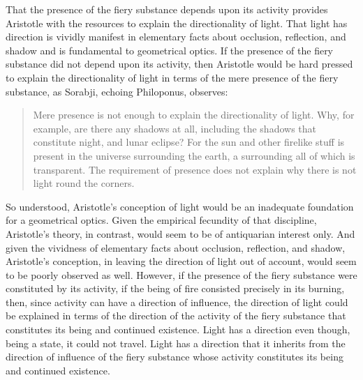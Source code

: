 That the presence of the fiery substance depends upon its activity provides Aristotle with the resources to explain the directionality of light. That light has direction is vividly manifest in elementary facts about occlusion, reflection, and shadow and is fundamental to geometrical optics. If the presence of the fiery substance did not depend upon its activity, then Aristotle would be hard pressed to explain the directionality of light in terms of the mere presence of the fiery substance, as Sorabji, echoing Philoponus, observes: 
\begin{quote}
	Mere presence is not enough to explain the directionality of light. Why, for example, are there any shadows at all, including the shadows that constitute night, and lunar eclipse? For the sun and other firelike stuff is present in the universe surrounding the earth, a surrounding all of which is transparent. The requirement of presence does not explain why there is not light round the corners. \citep[132]{Sorabji:2004fk}
\end{quote}
So understood, Aristotle's conception of light would be an inadequate foundation for a geometrical optics. Given the empirical fecundity of that discipline, Aristotle's theory, in contrast, would seem to be of antiquarian interest only. And given the vividness of elementary facts about occlusion, reflection, and shadow, Aristotle's conception, in leaving the direction of light out of account, would seem to be poorly observed as well. However, if the presence of the fiery substance were constituted by its activity, if the being of fire consisted precisely in its burning, then, since activity can have a direction of influence, the direction of light could be explained in terms of the direction of the activity of the fiery substance that constitutes its being and continued existence. Light has a direction even though, being a state, it could not travel. Light has a direction that it inherits from the direction of influence of the fiery substance whose activity constitutes its being and continued existence.

